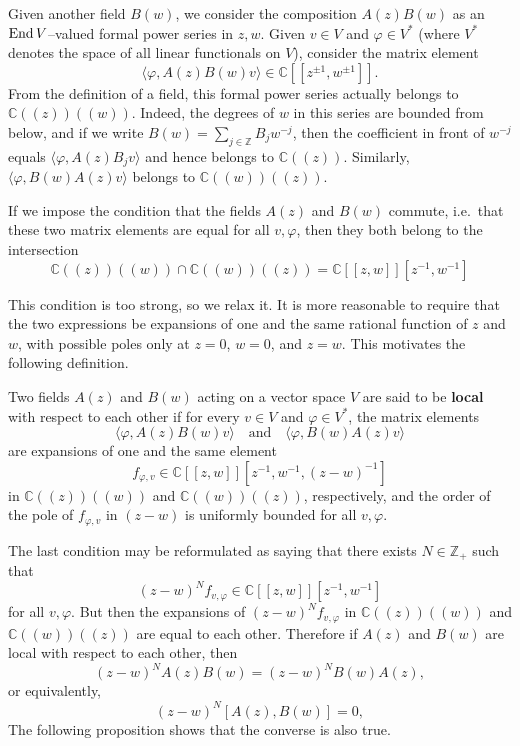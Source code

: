 \documentclass[12pt]{article}
\begin{document}
Given another field $B(w)$, we consider the composition $A(z)B(w)$ as an $\operatorname{End} V$–valued formal power series in $z,w$.  
Given $v \in V$ and $\varphi \in V^*$ (where $V^*$ denotes the space of all linear functionals on $V$), consider the matrix element
\[
\langle \varphi, A(z)B(w)v \rangle \in \mathbb{C}[[z^{\pm1}, w^{\pm1}]].
\]
From the definition of a field, this formal power series actually belongs to $\mathbb{C}((z))((w))$.
Indeed, the degrees of $w$ in this series are bounded from below, and if we write $B(w) = \sum_{j \in \mathbb{Z}} B_j w^{-j}$, then the coefficient in front of $w^{-j}$ equals $\langle \varphi, A(z)B_j v\rangle$ and hence belongs to $\mathbb{C}((z))$.
Similarly, $\langle \varphi, B(w)A(z)v\rangle$ belongs to $\mathbb{C}((w))((z))$.

If we impose the condition that the fields $A(z)$ and $B(w)$ commute, i.e.\ that these two matrix elements are equal for all $v,\varphi$, then they both belong to the intersection \[\mathbb{C}((z))((w)) \cap \mathbb{C}((w))((z)) = \mathbb{C}[[z,w]][z^{-1},w^{-1}]\]

This condition is too strong, so we relax it.  
It is more reasonable to require that the two expressions be expansions of one and the same rational function of $z$ and $w$, with possible poles only at $z=0$, $w=0$, and $z=w$.  
This motivates the following definition.

\begin{definition}
Two fields $A(z)$ and $B(w)$ acting on a vector space $V$ are said to be \textbf{local} with respect to each other if for every $v \in V$ and $\varphi \in V^*$, the matrix elements
\[
\langle \varphi, A(z)B(w)v \rangle \quad \text{and} \quad \langle \varphi, B(w)A(z)v \rangle
\]
are expansions of one and the same element
\[
f_{\varphi,v} \in \mathbb{C}[[z,w]][z^{-1},w^{-1},(z-w)^{-1}]
\]
in $\mathbb{C}((z))((w))$ and $\mathbb{C}((w))((z))$, respectively, and the order of the pole of $f_{\varphi,v}$ in $(z-w)$ is uniformly bounded for all $v,\varphi$.
\end{definition}

The last condition may be reformulated as saying that there exists
$N \in \mathbb{Z}_+$ such that
\[
    (z-w)^N f_{v,\varphi} \in \mathbb{C}[[z,w]][z^{-1},w^{-1}]
\]
for all $v,\varphi$. But then the expansions of $(z-w)^N f_{v,\varphi}$ in 
$\mathbb{C}((z))((w))$ and $\mathbb{C}((w))((z))$ are equal to each other. 
Therefore if $A(z)$ and $B(w)$ are local with respect to each other, then
\[
    (z-w)^N A(z)B(w) = (z-w)^N B(w)A(z),
\]
or equivalently,
\[
    (z-w)^N [A(z),B(w)] = 0,
\]
The following proposition shows that the converse is also true.
\end{document}
